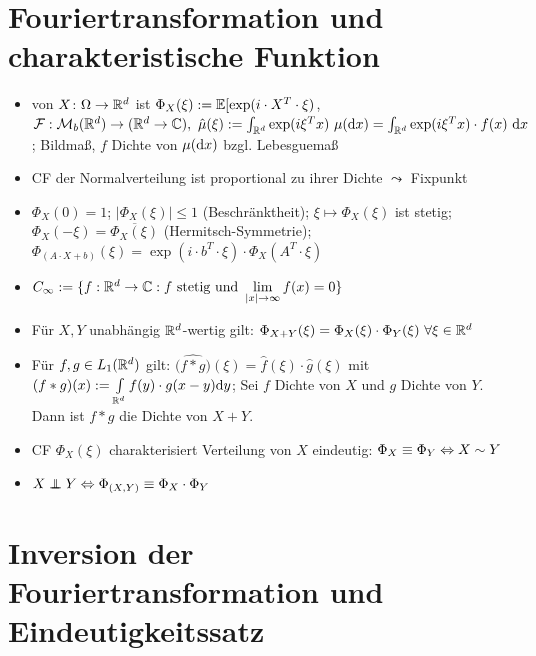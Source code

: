 \documentclass[12pt]{scrartcl}
\begin{document}
	\section{Fouriertransformation und charakteristische Funktion}
	
	\begin{itemize}
		\item {} von $X\colon\Omega\to\mathbb{R}^d$ ist $\Phi_X(\xi):=\mathbb{E}[\exp(i\cdot X^T\cdot\xi)$,  $\mathcal{F}:\mathcal{M}_b(\mathbb{R}^d)\to(\mathbb{R}^d\to\mathbb{C}),~\hat{\mu}(\xi):=\int_{\mathbb{R}^d}\exp(i\xi^T x)~\mu(\mathrm{d} x)=\int_{\mathbb{R}^d}\exp(i\xi^T x)\cdot f(x)~\mathrm{d} x$; Bildmaß, $f$ Dichte von $\mu(\mathrm{d} x)$ bzgl. Lebesguemaß
		\item CF der Normalverteilung ist proportional zu ihrer Dichte $\leadsto$ Fixpunkt
		\item $\Phi_X(0)=1$; $|\Phi_X(\xi)|\leq1$ (Beschränktheit); $\xi\mapsto\Phi_X(\xi)$ ist stetig; $\Phi_X(-\xi)=\overline{\Phi_X(\xi)}$ (Hermitsch-Symmetrie); $\Phi_{(A\cdot X+b)}(\xi)=\exp(i\cdot b^T\cdot\xi)\cdot\Phi_X(A^T\cdot\xi)$
		\item $C_\infty:=\lbrace f:\mathbb{R}^d\to\mathbb{C}:f\text{ stetig und }\lim\limits_{|x|\to\infty}f(x)=0\rbrace$
		\item Für $X,Y$ unabhängig $\mathbb{R}^d$-wertig gilt: $\Phi_{X+Y}(\xi)=\Phi_X(\xi)\cdot\Phi_Y(\xi)~\forall\xi\in\mathbb{R}^d$
		\item Für $f,g\in L_1(\mathbb{R}^d)$ gilt: $\big(\widehat{f\ast g}\big)(\xi)=\hat{f}(\xi)\cdot\hat{g}(\xi)$
		mit $(f\ast g)(x):=\int\limits_{\mathbb{R}^d}f(y)\cdot g(x-y)\mathrm{d} y$;
		Sei $f$ Dichte von $X$ und $g$ Dichte von $Y$. Dann ist $f\ast g$ die Dichte von $X+Y$.
		\item {} CF $\Phi_X(\xi)$ charakterisiert Verteilung von $X$ eindeutig: $\Phi_X\equiv\Phi_Y\Leftrightarrow X\sim Y$
		\item {} $X\unab Y\gdw\Phi_{(X,Y)}\equiv\Phi_X\cdot\Phi_Y$
	\end{itemize}
	
	\section{Inversion der Fouriertransformation und Eindeutigkeitssatz}
	
\end{document}
